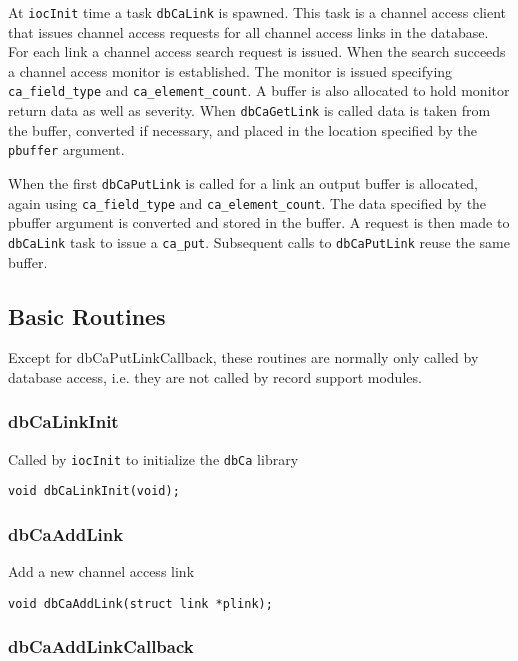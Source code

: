 At \verb|iocInit| time a task \verb|dbCaLink| is spawned. This task is a channel access client that issues channel access requests 
for all channel access links in the database. For each link a channel access search request is issued. When the search 
succeeds a channel access monitor is established. The monitor is issued specifying \verb|ca_field_type| and 
\verb|ca_element_count|. A buffer is also allocated to hold monitor return data as well as severity. When \verb|dbCaGetLink| is 
called data is taken from the buffer, converted if necessary, and placed in the location specified by the \verb|pbuffer| 
argument.

When the first \verb|dbCaPutLink| is called for a link an output buffer is allocated, again using \verb|ca_field_type| and 
\verb|ca_element_count|. The data specified by the pbuffer argument is converted and stored in the buffer. A request is then 
made to \verb|dbCaLink| task to issue a \verb|ca_put|. Subsequent calls to \verb|dbCaPutLink| reuse the same buffer.

\subsection{Basic Routines}

Except for dbCaPutLinkCallback, these routines are normally only called by database access, i.e. they are not called by 
record support modules.

\subsubsection{dbCaLinkInit}

Called by \verb|iocInit| to initialize the \verb|dbCa| library

\begin{verbatim}
void dbCaLinkInit(void);
\end{verbatim}

\subsubsection{dbCaAddLink}

Add a new channel access link

\begin{verbatim}
void dbCaAddLink(struct link *plink);
\end{verbatim}

\subsubsection{dbCaAddLinkCallback}

